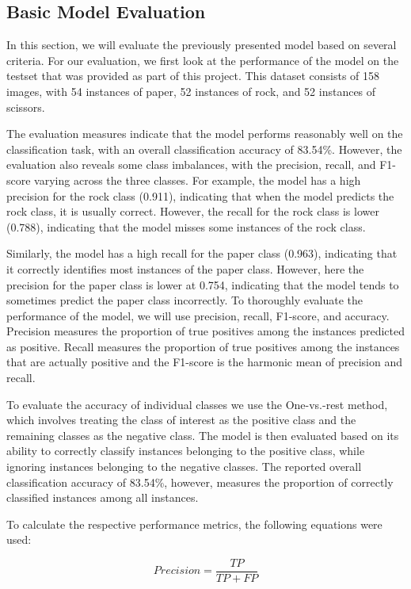 \documentclass[a4paper]{article}
\begin{document}
\subsection{Basic Model Evaluation} \label{sec:basicEval}
In this section, we will evaluate the previously presented model based on several criteria. For our evaluation, we first look at the performance of the model on the testset that was provided as part of this project. This dataset consists of 158 images, with 54 instances of paper, 52 instances of rock, and 52 instances of scissors.

The evaluation measures indicate that the model performs reasonably well on the classification task, with an overall classification accuracy of 83.54\%. However, the evaluation also reveals some class imbalances, with the precision, recall, and F1-score varying across the three classes. 
For example, the model has a high precision for the rock class (0.911), indicating that when the model predicts the rock class, it is usually correct. However, the recall for the rock class is lower (0.788), indicating that the model misses some instances of the rock class.

Similarly, the model has a high recall for the paper class (0.963), indicating that it correctly identifies most instances of the paper class. However, here the precision for the paper class is lower at 0.754, indicating that the model tends to sometimes predict the paper class incorrectly.
To thoroughly evaluate the performance of the model, we will use precision, recall, F1-score, and accuracy. Precision measures the proportion of true positives among the instances predicted as positive. Recall measures the proportion of true positives among the instances that are actually positive and the F1-score is the harmonic mean of precision and recall. 

To evaluate the accuracy of individual classes we use the One-vs.-rest method, which involves treating the class of interest as the positive class and the remaining classes as the negative class. The model is then evaluated based on its ability to correctly classify instances belonging to the positive class, while ignoring instances belonging to the negative classes. The reported overall classification accuracy of 83.54\%, however, measures the proportion of correctly classified instances among all instances.

To calculate the respective performance metrics, the following equations \citep{metric_formulas} were used:

\begin{equation}
	Precision = \frac{TP}{TP + FP}
\end{equation}
\end{document}
